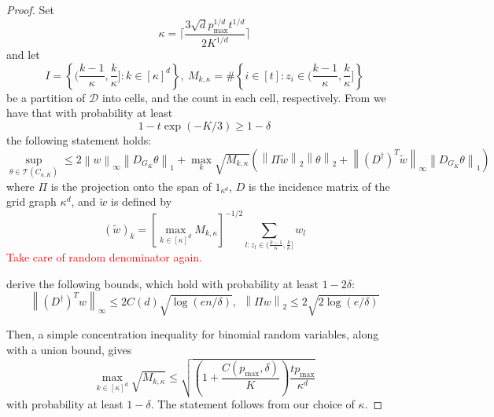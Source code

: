 \documentclass{article}
\newcommand{\norm}[1]{\left\lVert#1\right\rVert}
\newcommand{\set}[1]{\left\{#1\right\}}
\newcommand{\1}{\mathbb{I}}
\newcommand{\D}{\mathcal{D}}
\theoremstyle{alden}
\theoremstyle{aldenthm}
\theoremstyle{definition}
\theoremstyle{remark}
\begin{document}
\begin{proof}
	Set 
	\begin{equation*}
	\kappa = \lceil \frac{3\sqrt{d} p_{\max}^{1/d}t^{1/d}}{2 K^{1/d}} \rceil
	\end{equation*}
	and let 
	\begin{equation*}
	I = \set{\biggl(\frac{k - 1}{\kappa}, \frac{k}{\kappa}\biggr]: k \in [\kappa]^d},~ M_{k, \kappa} = \# \set{i \in [t]: z_i \in \biggl(\frac{k - 1}{\kappa}, \frac{k}{\kappa}\biggr]}
	\end{equation*}
	be a partition of $\D$ into cells, and the count in each cell, respectively. From \citep{padilla2018} we have that with probability at least
	\begin{equation*}
	1 - t \exp(-K/3) \geq 1 - \delta
	\end{equation*}
	the following statement holds:
	\begin{equation*}
	\sup_{\theta \in \mathcal{T}(C_{n,K})} \leq 2 \norm{w}_{\infty} \norm{D_{G_K} \theta}_1 + \max_{k} \sqrt{M_{k,\kappa}} \left( \norm{\Pi \widetilde{w}}_2 \norm{\theta}_2 + \norm{(D^{\dagger})^T \widetilde{w}}_{\infty} \norm{D_{G_K} \theta}_1 \right)
	\end{equation*}
	where $\Pi$ is the projection onto the span of $1_{\kappa^d}$, $D$ is the incidence matrix of the grid graph $\kappa^d$, and $\widetilde{w}$ is defined by
	\begin{equation*}
	(\widetilde{w})_k = \left[\max_{k \in [\kappa]^d} M_{k,\kappa}\right]^{-1/2} \sum_{l: z_l \in (\frac{k - 1}{\kappa}, \frac{k}{\kappa}]} w_{l}
	\end{equation*}
	\textcolor{red}{Take care of random denominator again.}
	
	\citep{hutter2016} derive the following bounds, which hold with probability at least $1 - 2\delta$:
	\begin{equation*}
	\norm{(D^{\dagger})^T w}_{\infty} \leq 2 C(d) \sqrt{\log(en/\delta)}, ~~ \norm{\Pi w}_2 \leq 2 \sqrt{2 \log(e / \delta)}
	\end{equation*}
	
	Then, a simple concentration inequality for binomial random variables, along with a union bound, gives
	\begin{equation*}
	\max_{k \in [\kappa]^d} \sqrt{M_{k, \kappa}} \leq \sqrt{(1 + \frac{C(p_{\max}, \delta)}{K})\frac{tp_{\max}}{\kappa^d}}
	\end{equation*}
	with probability at least $1 - \delta$. The statement follows from our choice of $\kappa$.
\end{proof}
\end{document}
